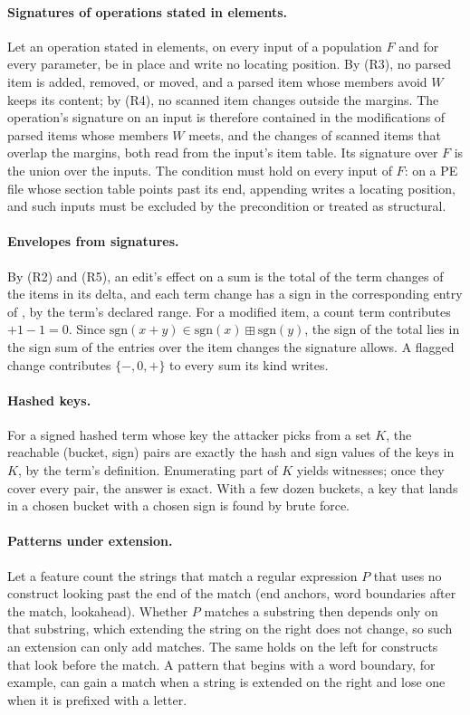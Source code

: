 \paragraph{Signatures of operations stated in elements.}
Let an operation stated in elements, on every input of a population $F$ and for every parameter, be in place and
write no locating position. By (R3), no parsed item is added, removed, or moved, and a parsed item whose members avoid
$W$ keeps its content; by (R4), no scanned item changes outside the margins. The operation's signature on an input is
therefore contained in the modifications of parsed items whose members $W$ meets, and the changes of scanned items
that overlap the margins, both read from the input's item table. Its signature over $F$ is the union over the inputs.
The condition must hold on every input of $F$: on a PE file whose section table points past its end, appending writes
a locating position, and such inputs must be excluded by the precondition or treated as structural.

\paragraph{Envelopes from signatures.}
By (R2) and (R5), an edit's effect on a sum is the total of the term changes of the items in its delta, and each term
change has a sign in the corresponding entry of , by the term's declared range. For a modified
item, a count term contributes $+1 - 1 = 0$. Since $\mathrm{sgn}(x + y) \in \mathrm{sgn}(x) \boxplus \mathrm{sgn}(y)$,
the sign of the total lies in the sign sum of the entries over the item changes the signature allows. A flagged change
contributes $\{-, 0, +\}$ to every sum its kind writes.

\paragraph{Hashed keys.}
For a signed hashed term whose key the attacker picks from a set $K$, the reachable (bucket, sign) pairs are exactly
the hash and sign values of the keys in $K$, by the term's definition. Enumerating part of $K$ yields witnesses; once
they cover every pair, the answer is exact. With a few dozen buckets, a key that lands in a chosen bucket with a
chosen sign is found by brute force.

\paragraph{Patterns under extension.}
Let a feature count the strings that match a regular expression $P$ that uses no construct looking past the end of
the match (end anchors, word boundaries after the match, lookahead). Whether $P$ matches a substring then depends
only on that substring, which extending the string on the right does not change, so such an extension can only add
matches. The same holds on the left for constructs that look before the match. A pattern that begins with a word
boundary, for example, can gain a match when a string is extended on the right and lose one when it is prefixed with
a letter.

